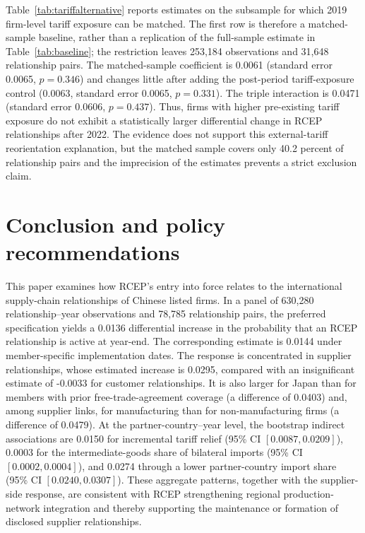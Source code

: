 \documentclass[preprint,12pt,authoryear]{elsarticle}
\begin{document}
Table~\ref{tab:tariffalternative} reports estimates on the subsample for which 2019 firm-level tariff exposure can be matched. The first row is therefore a matched-sample baseline, rather than a replication of the full-sample estimate in Table~\ref{tab:baseline}; the restriction leaves 253,184 observations and 31,648 relationship pairs. The matched-sample coefficient is 0.0061 (standard error 0.0065, $p=0.346$) and changes little after adding the post-period tariff-exposure control (0.0063, standard error 0.0065, $p=0.331$). The triple interaction is 0.0471 (standard error 0.0606, $p=0.437$). Thus, firms with higher pre-existing tariff exposure do not exhibit a statistically larger differential change in RCEP relationships after 2022. The evidence does not support this external-tariff reorientation explanation, but the matched sample covers only 40.2 percent of relationship pairs and the imprecision of the estimates prevents a strict exclusion claim.



\section{Conclusion and policy recommendations}
\label{sec:conclusion}

This paper examines how RCEP's entry into force relates to the international supply-chain relationships of Chinese listed firms. In a panel of 630,280 relationship--year observations and 78,785 relationship pairs, the preferred specification yields a 0.0136 differential increase in the probability that an RCEP relationship is active at year-end. The corresponding estimate is 0.0144 under member-specific implementation dates. The response is concentrated in supplier relationships, whose estimated increase is 0.0295, compared with an insignificant estimate of -0.0033 for customer relationships. It is also larger for Japan than for members with prior free-trade-agreement coverage (a difference of 0.0403) and, among supplier links, for manufacturing than for non-manufacturing firms (a difference of 0.0479). At the partner-country--year level, the bootstrap indirect associations are 0.0150 for incremental tariff relief (95\% CI $[0.0087,0.0209]$), 0.0003 for the intermediate-goods share of bilateral imports (95\% CI $[0.0002,0.0004]$), and 0.0274 through a lower partner-country import share (95\% CI $[0.0240,0.0307]$). These aggregate patterns, together with the supplier-side response, are consistent with RCEP strengthening regional production-network integration and thereby supporting the maintenance or formation of disclosed supplier relationships.
\end{document}
